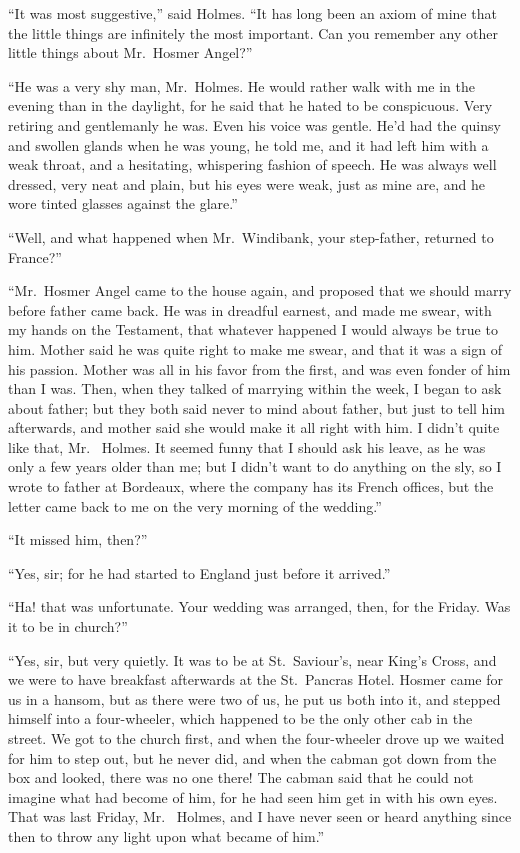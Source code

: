 “It was most suggestive,” said Holmes. “It has long been
an axiom of mine that the little things are infinitely the most
important. Can you remember any other little things about
Mr.~Hosmer Angel?”

“He was a very shy man, Mr.~Holmes. He would rather
walk with me in the evening than in the daylight, for he said
that he hated to be conspicuous. Very retiring and gentlemanly
he was. Even his voice was gentle. He’d had the
quinsy and swollen glands when he was young, he told me,
and it had left him with a weak throat, and a hesitating,
whispering fashion of speech. He was always well dressed,
very neat and plain, but his eyes were weak, just as mine are,
and he wore tinted glasses against the glare.”

“Well, and what happened when Mr.~Windibank, your step-father,
returned to France?”

“Mr.~Hosmer Angel came to the house again, and proposed
that we should marry before father came back. He was in
dreadful earnest, and made me swear, with my hands on the
Testament, that whatever happened I would always be true
to him. Mother said he was quite right to make me swear,
and that it was a sign of his passion. Mother was all in his
favor from the first, and was even fonder of him than I was.
Then, when they talked of marrying within the week, I began
to ask about father; but they both said never to mind about
father, but just to tell him afterwards, and mother said she
would make it all right with him. I didn’t quite like that, Mr.\ %
Holmes. It seemed funny that I should ask his leave, as he
was only a few years older than me; but I didn’t want to do
anything on the sly, so I wrote to father at Bordeaux, where
the company has its French offices, but the letter came back
to me on the very morning of the wedding.”

“It missed him, then?”

“Yes, sir; for he had started to England just before it arrived.”

“Ha! that was unfortunate. Your wedding was arranged,
then, for the Friday. Was it to be in church?”

“Yes, sir, but very quietly. It was to be at St.~Saviour’s,
near King’s Cross, and we were to have breakfast afterwards
at the St.~Pancras Hotel. Hosmer came for us in a hansom,
but as there were two of us, he put us both into it, and stepped
himself into a four-wheeler, which happened to be the only
other cab in the street. We got to the church first, and when
the four-wheeler drove up we waited for him to step out, but
he never did, and when the cabman got down from the box
and looked, there was no one there! The cabman said that
he could not imagine what had become of him, for he had
seen him get in with his own eyes. That was last Friday, Mr.\ %
Holmes, and I have never seen or heard anything since then
to throw any light upon what became of him.”

